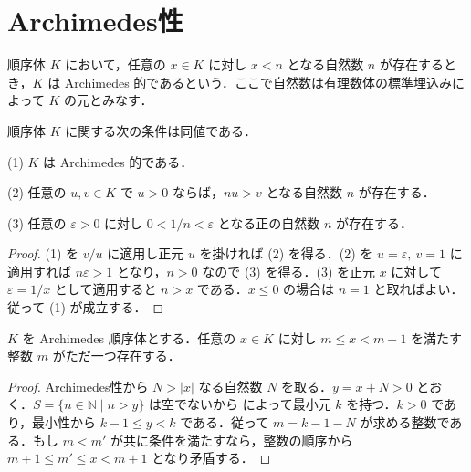\section{Archimedes性}
\begin{defn}[Archimedes順序体]
順序体 $K$ において，任意の $x\in K$ に対し $x<n$ となる自然数 $n$ が存在するとき，$K$ は Archimedes 的であるという．ここで自然数は有理数体の標準埋込みによって $K$ の元とみなす．
\end{defn}
\begin{prop}[Archimedes性の同値条件]
順序体 $K$ に関する次の条件は同値である．

(1) $K$ は Archimedes 的である．

(2) 任意の $u,v\in K$ で $u>0$ ならば，$nu>v$ となる自然数 $n$ が存在する．

(3) 任意の $\varepsilon>0$ に対し $0<1/n<\varepsilon$ となる正の自然数 $n$ が存在する．
\end{prop}
\begin{proof}
(1) を $v/u$ に適用し正元 $u$ を掛ければ (2) を得る．(2) を $u=\varepsilon,\ v=1$ に適用すれば $n\varepsilon>1$ となり，$n>0$ なので (3) を得る．(3) を正元 $x$ に対して $\varepsilon=1/x$ として適用すると $n>x$ である．$x\leq0$ の場合は $n=1$ と取ればよい．従って (1) が成立する．
\end{proof}
\begin{prop}[Archimedes順序体における整数部分]
$K$ を Archimedes 順序体とする．任意の $x\in K$ に対し $m\leq x<m+1$ を満たす整数 $m$ がただ一つ存在する．
\end{prop}
\begin{proof}
Archimedes性から $N>|x|$ なる自然数 $N$ を取る．$y=x+N>0$ とおく．$S=\{n\in\mathbb N\mid n>y\}$ は空でないから によって最小元 $k$ を持つ．$k>0$ であり，最小性から $k-1\leq y<k$ である．従って $m=k-1-N$ が求める整数である．もし $m<m'$ が共に条件を満たすなら，整数の順序から $m+1\leq m'\leq x<m+1$ となり矛盾する．
\end{proof}
